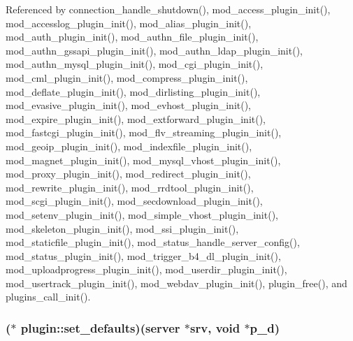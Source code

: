 Referenced by connection\-\_\-handle\-\_\-shutdown(), mod\-\_\-access\-\_\-plugin\-\_\-init(), mod\-\_\-accesslog\-\_\-plugin\-\_\-init(), mod\-\_\-alias\-\_\-plugin\-\_\-init(), mod\-\_\-auth\-\_\-plugin\-\_\-init(), mod\-\_\-authn\-\_\-file\-\_\-plugin\-\_\-init(), mod\-\_\-authn\-\_\-gssapi\-\_\-plugin\-\_\-init(), mod\-\_\-authn\-\_\-ldap\-\_\-plugin\-\_\-init(), mod\-\_\-authn\-\_\-mysql\-\_\-plugin\-\_\-init(), mod\-\_\-cgi\-\_\-plugin\-\_\-init(), mod\-\_\-cml\-\_\-plugin\-\_\-init(), mod\-\_\-compress\-\_\-plugin\-\_\-init(), mod\-\_\-deflate\-\_\-plugin\-\_\-init(), mod\-\_\-dirlisting\-\_\-plugin\-\_\-init(), mod\-\_\-evasive\-\_\-plugin\-\_\-init(), mod\-\_\-evhost\-\_\-plugin\-\_\-init(), mod\-\_\-expire\-\_\-plugin\-\_\-init(), mod\-\_\-extforward\-\_\-plugin\-\_\-init(), mod\-\_\-fastcgi\-\_\-plugin\-\_\-init(), mod\-\_\-flv\-\_\-streaming\-\_\-plugin\-\_\-init(), mod\-\_\-geoip\-\_\-plugin\-\_\-init(), mod\-\_\-indexfile\-\_\-plugin\-\_\-init(), mod\-\_\-magnet\-\_\-plugin\-\_\-init(), mod\-\_\-mysql\-\_\-vhost\-\_\-plugin\-\_\-init(), mod\-\_\-proxy\-\_\-plugin\-\_\-init(), mod\-\_\-redirect\-\_\-plugin\-\_\-init(), mod\-\_\-rewrite\-\_\-plugin\-\_\-init(), mod\-\_\-rrdtool\-\_\-plugin\-\_\-init(), mod\-\_\-scgi\-\_\-plugin\-\_\-init(), mod\-\_\-secdownload\-\_\-plugin\-\_\-init(), mod\-\_\-setenv\-\_\-plugin\-\_\-init(), mod\-\_\-simple\-\_\-vhost\-\_\-plugin\-\_\-init(), mod\-\_\-skeleton\-\_\-plugin\-\_\-init(), mod\-\_\-ssi\-\_\-plugin\-\_\-init(), mod\-\_\-staticfile\-\_\-plugin\-\_\-init(), mod\-\_\-status\-\_\-handle\-\_\-server\-\_\-config(), mod\-\_\-status\-\_\-plugin\-\_\-init(), mod\-\_\-trigger\-\_\-b4\-\_\-dl\-\_\-plugin\-\_\-init(), mod\-\_\-uploadprogress\-\_\-plugin\-\_\-init(), mod\-\_\-userdir\-\_\-plugin\-\_\-init(), mod\-\_\-usertrack\-\_\-plugin\-\_\-init(), mod\-\_\-webdav\-\_\-plugin\-\_\-init(), plugin\-\_\-free(), and plugins\-\_\-call\-\_\-init().

\hypertarget{structplugin_a04251883174cadf3e02ae1b1a388bdb7}{
\subsubsection[{set\-\_\-defaults}]{($\ast$  plugin\-::set\-\_\-defaults)({\bf server} $\ast$srv, void $\ast$p\-\_\-d)}}\label{structplugin_a04251883174cadf3e02ae1b1a388bdb7}


